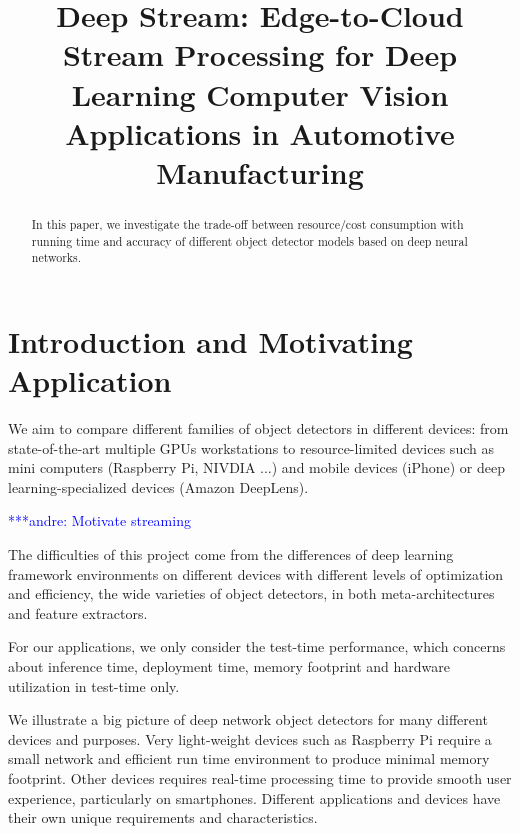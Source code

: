 \documentclass[conference]{IEEEtran}
\newcommand{\alnote}[1]{ {\textcolor{blue} { ***andre: #1 }}}
\newcommand{\alnote}[1]{}
\begin{document}
\title{Deep Stream: Edge-to-Cloud Stream Processing for Deep Learning Computer Vision Applications in  Automotive Manufacturing}
%


\maketitle

\thispagestyle{plain}
\pagestyle{plain}



\begin{abstract}
In this paper, we investigate the trade-off between resource/cost consumption with running time and accuracy of different object detector models based on deep neural networks.
\end{abstract}


\IEEEpeerreviewmaketitle

\nocite{*}

\section{Introduction and Motivating Application}

We aim to compare different families of object detectors in different devices: from state-of-the-art multiple GPUs workstations to resource-limited devices such as mini computers (Raspberry Pi, NIVDIA ...) and mobile devices (iPhone) or deep learning-specialized devices (Amazon DeepLens).

\alnote{Motivate streaming}

The difficulties of this project come from the differences of deep learning framework environments on different devices with different levels of optimization and efficiency, the wide varieties of object detectors, in both meta-architectures and feature extractors. 

For our applications, we only consider the test-time performance, which concerns about inference time, deployment time, memory footprint and hardware utilization in test-time only.

We illustrate a big picture of deep network object detectors for many different devices and purposes. Very light-weight devices such as Raspberry Pi require a small network and efficient run time environment to produce minimal memory footprint. Other devices requires real-time processing time to provide smooth user experience, particularly on smartphones. Different applications and devices have their own unique requirements and characteristics. 
\end{document}
